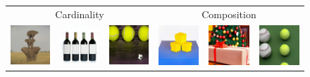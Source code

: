 \begin{figure}
  \centering
  \begin{tabular}{p{25mm}p{25mm}p{25mm}|p{25mm}p{25mm}p{25mm}}
    \multicolumn{3}{c}{Cardinality} &
    \multicolumn{3}{c}{Composition}
    \\
    \includegraphics[width=26mm]{figs/verticals/cardinality_00430_maskgit_sresg1r1} &       \includegraphics[width=26mm]{figs/verticals/cardinality_00708_maskgit_sresg1r1} &
    \includegraphics[width=26mm]{figs/verticals/cardinality_00087_maskgit_sresg1r1} &
    \includegraphics[width=26mm]{figs/verticals/composition_00678_maskgit_sresg1r1} &
    \includegraphics[width=26mm]{figs/verticals/composition_00681_maskgit_sresg1r1} &
    \includegraphics[width=26mm]{figs/verticals/composition_01426_maskgit_sresg1r1}

\end{tabular}
\end{figure}
